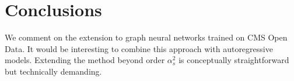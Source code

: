 \section{Conclusions}\label{sec:conclusions}

We comment on the extension to graph neural networks trained on CMS Open
Data. It would be interesting to combine this approach with
autoregressive models. Extending the method beyond order $\alpha_s^2$ is
conceptually straightforward but technically demanding.

